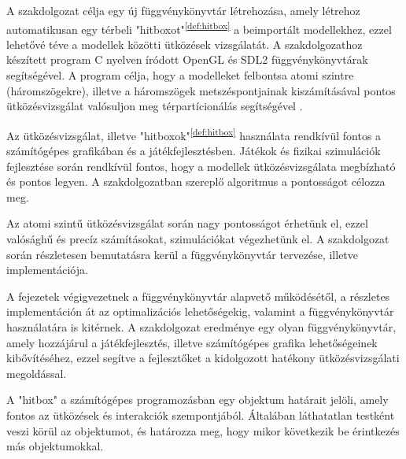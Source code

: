 
A szakdolgozat célja egy új függvénykönyvtár létrehozása, amely létrehoz automatikusan egy térbeli "hitboxot"\textsuperscript{\ref{def:hitbox}} a beimportált modellekhez, ezzel lehetővé téve a modellek közötti ütközések vizsgálatát. A szakdolgozathoz készített program C \cite{C} nyelven íródott OpenGL \cite{OpenGL} és SDL2 \cite{SDL2} függvénykönyvtárak segítségével. A program célja, hogy a modelleket felbontsa atomi szintre (háromszögekre), illetve a háromszögek metszéspontjainak kiszámításával pontos ütközésvizsgálat valósuljon meg térpartícionálás segítségével \cite{ter}.

Az ütközésvizsgálat, illetve "hitboxok"\textsuperscript{\ref{def:hitbox}} használata rendkívül fontos a számítógépes grafikában és a játékfejlesztésben. Játékok és fizikai szimulációk fejlesztése során rendkívül fontos, hogy a modellek ütközésvizsgálata megbízható és pontos legyen. A szakdolgozatban szereplő algoritmus a pontosságot célozza meg.

Az atomi szintű ütközésvizsgálat során nagy pontosságot érhetünk el, ezzel valósághű és precíz számításokat, szimulációkat végezhetünk el. A szakdolgozat során részletesen bemutatásra kerül a függvénykönyvtár tervezése, illetve implementációja.

A fejezetek végigvezetnek a függvénykönyvtár alapvető működésétől, a részletes implementáción át az optimalizációs lehetőségekig, valamint a függvénykönyvtár használatára is kitérnek. A szakdolgozat eredménye egy olyan függvénykönyvtár, amely hozzájárul a játékfejlesztés, illetve számítógépes grafika lehetőségeinek kibővítéséhez, ezzel segítve a fejlesztőket a kidolgozott hatékony ütközésvizsgálati megoldással.
\vfill
\begin{definition}[Hitbox]
	A "hitbox" a számítógépes programozásban egy objektum határait jelöli, amely fontos az ütközések és interakciók szempontjából. Általában láthatatlan testként veszi körül az objektumot, és határozza meg, hogy mikor következik be érintkezés más objektumokkal. 
	\label{def:hitbox}
\end{definition}
